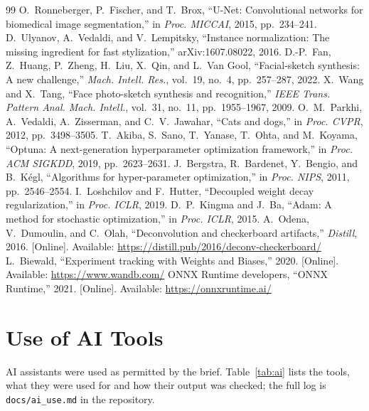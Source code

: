 \documentclass[conference]{IEEEtran}
\begin{document}
\begin{thebibliography}{99}
 O.~Ronneberger, P.~Fischer, and T.~Brox, ``U-Net: Convolutional networks for biomedical image segmentation,'' in \emph{Proc. MICCAI}, 2015, pp.~234--241.
 D.~Ulyanov, A.~Vedaldi, and V.~Lempitsky, ``Instance normalization: The missing ingredient for fast stylization,'' arXiv:1607.08022, 2016.
 D.-P.~Fan, Z.~Huang, P.~Zheng, H.~Liu, X.~Qin, and L.~Van Gool, ``Facial-sketch synthesis: A new challenge,'' \emph{Mach. Intell. Res.}, vol.~19, no.~4, pp.~257--287, 2022.
 X.~Wang and X.~Tang, ``Face photo-sketch synthesis and recognition,'' \emph{IEEE Trans. Pattern Anal. Mach. Intell.}, vol.~31, no.~11, pp.~1955--1967, 2009.
 O.~M.~Parkhi, A.~Vedaldi, A.~Zisserman, and C.~V.~Jawahar, ``Cats and dogs,'' in \emph{Proc. CVPR}, 2012, pp.~3498--3505.
 T.~Akiba, S.~Sano, T.~Yanase, T.~Ohta, and M.~Koyama, ``Optuna: A next-generation hyperparameter optimization framework,'' in \emph{Proc. ACM SIGKDD}, 2019, pp.~2623--2631.
 J.~Bergstra, R.~Bardenet, Y.~Bengio, and B.~K\'egl, ``Algorithms for hyper-parameter optimization,'' in \emph{Proc. NIPS}, 2011, pp.~2546--2554.
 I.~Loshchilov and F.~Hutter, ``Decoupled weight decay regularization,'' in \emph{Proc. ICLR}, 2019.
 D.~P.~Kingma and J.~Ba, ``Adam: A method for stochastic optimization,'' in \emph{Proc. ICLR}, 2015.
 A.~Odena, V.~Dumoulin, and C.~Olah, ``Deconvolution and checkerboard artifacts,'' \emph{Distill}, 2016. [Online]. Available: \url{https://distill.pub/2016/deconv-checkerboard/}
 L.~Biewald, ``Experiment tracking with Weights and Biases,'' 2020. [Online]. Available: \url{https://www.wandb.com/}
 ONNX Runtime developers, ``ONNX Runtime,'' 2021. [Online]. Available: \url{https://onnxruntime.ai/}
\end{thebibliography}

\appendices
\section{Use of AI Tools}
AI assistants were used as permitted by the brief. Table~\ref{tab:ai} lists the tools, what they were used for and how
their output was checked; the full log is \texttt{docs/ai\_use.md} in the repository.
\end{document}
